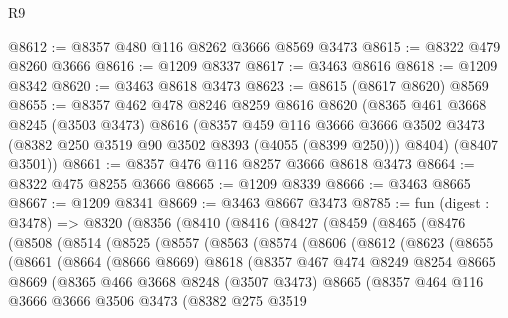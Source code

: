 \begin{lexlean}{R9}
\begin{coremodule}
@8612 := @8357 @480 @116 @8262 @3666 @8569 @3473
@8615 := @8322 @479 @8260 @3666
@8616 := @1209 @8337
@8617 := @3463 @8616
@8618 := @1209 @8342
@8620 := @3463 @8618 @3473
@8623 := @8615 (@8617 @8620) @8569
@8655 := @8357
    @462
    @478
    @8246
    @8259
    @8616
    @8620
    (@8365
      @461
      @3668
      @8245
      (@3503 @3473)
      @8616
      (@8357
        @459
        @116
        @3666
        @3666
        @3502
        @3473
        (@8382 @250 @3519 @90 @3502 @8393 (@4055 (@8399 @250)))
        @8404)
      (@8407 @3501))
@8661 := @8357 @476 @116 @8257 @3666 @8618 @3473
@8664 := @8322 @475 @8255 @3666
@8665 := @1209 @8339
@8666 := @3463 @8665
@8667 := @1209 @8341
@8669 := @3463 @8667 @3473
@8785 := fun (digest : @3478) =>
  @8320
    (@8356
      (@8410
        (@8416
          (@8427
            (@8459
              (@8465
                (@8476
                  (@8508
                    (@8514
                      (@8525
                        (@8557
                          (@8563
                            (@8574
                              (@8606
                                (@8612
                                  (@8623
                                    (@8655
                                      (@8661
                                        (@8664
                                          (@8666 @8669)
                                          @8618
                                          (@8357
                                            @467
                                            @474
                                            @8249
                                            @8254
                                            @8665
                                            @8669
                                            (@8365
                                              @466
                                              @3668
                                              @8248
                                              (@3507 @3473)
                                              @8665
                                              (@8357
                                                @464
                                                @116
                                                @3666
                                                @3666
                                                @3506
                                                @3473
                                                (@8382
                                                  @275
                                                  @3519

\end{coremodule}
\end{lexlean}
